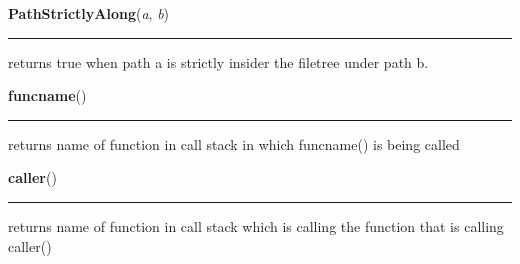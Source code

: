     \label{System:Utils:PathStrictlyAlong}

    \vspace{0.5ex}

\hspace{.8\funcindent}\begin{boxedminipage}{\funcwidth}

    \raggedright \textbf{PathStrictlyAlong}(\textit{a}, \textit{b})

    \vspace{-1.5ex}

    \rule{\textwidth}{0.5\fboxrule}
\setlength{\parskip}{2ex}
    returns true when path a is strictly insider the filetree under path b.

\setlength{\parskip}{1ex}
    \end{boxedminipage}

    \label{System:Utils:funcname}

    \vspace{0.5ex}

\hspace{.8\funcindent}\begin{boxedminipage}{\funcwidth}

    \raggedright \textbf{funcname}()

    \vspace{-1.5ex}

    \rule{\textwidth}{0.5\fboxrule}
\setlength{\parskip}{2ex}
    returns name of function in call stack in which funcname() is being 
    called

\setlength{\parskip}{1ex}
    \end{boxedminipage}

    \label{System:Utils:caller}

    \vspace{0.5ex}

\hspace{.8\funcindent}\begin{boxedminipage}{\funcwidth}

    \raggedright \textbf{caller}()

    \vspace{-1.5ex}

    \rule{\textwidth}{0.5\fboxrule}
\setlength{\parskip}{2ex}
    returns name of function in call stack which is calling the function 
    that  is calling caller()

\setlength{\parskip}{1ex}
    \end{boxedminipage}

